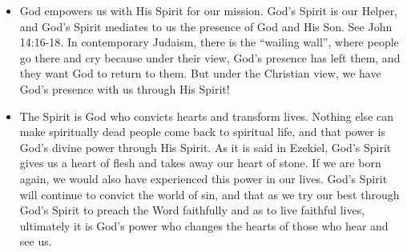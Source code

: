 \begin{itemize}
{  fruits of the Spirit.}
  \item{God empowers us with His Spirit for our mission.  God's Spirit is our
  Helper, and God's Spirit mediates to us the presence of God and His Son.
  See John 14:16-18.  In contemporary Judaism, there is the ``wailing wall'',
  where people go there and cry because under their view, God's presence has
  left them, and they want God to return to them.  But under the Christian
  view, we have God's presence with us through His Spirit!}
  \item{The Spirit is God who convicts hearts and transform lives.  Nothing
  else can make spiritually dead people come back to spiritual life, and that
  power is God's divine power through His Spirit.  As it is said in Ezekiel,
  God's Spirit gives us a heart of flesh and takes away our heart of stone.
  If we are born again, we would also have experienced this power in our
  lives.  God's Spirit will continue to convict the world of sin, and that as
  we try our best through God's Spirit to preach the Word faithfully and as
  to live faithful lives, ultimately it is God's power who changes the hearts
  of those who hear and see us.}
\end{itemize}